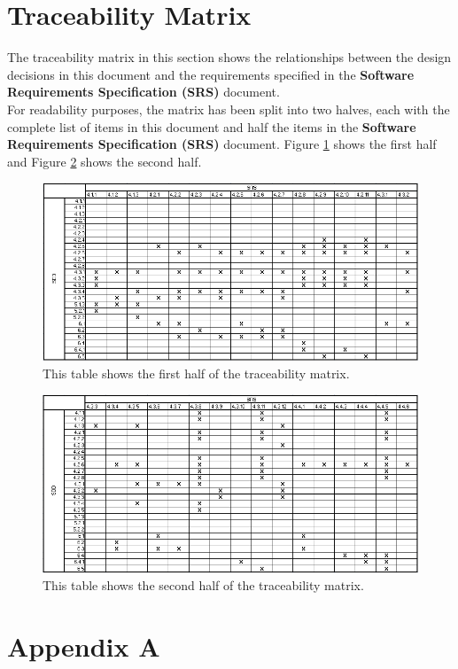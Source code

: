 \documentclass[11pt]{article}
\begin{document}
\section{Traceability Matrix}\label{section-trace-matrix}
The traceability matrix in this section shows the relationships between the design decisions in this document and the requirements specified in the \textbf{Software Requirements Specification (SRS)} document.\\
For readability purposes, the matrix has been split into two halves, each with the complete list of items in this document and half the items in the \textbf{Software Requirements Specification (SRS)} document. Figure \ref{tbl-trace-1} shows the first half and Figure \ref{tbl-trace-2} shows the second half.
\begin{figure}[H]
\centering
\includegraphics[width=5in]{./images/trace_matrix_1.png}
\caption[Traceability Matrix Part 1]{This table shows the first half of the traceability matrix.}
\label{tbl-trace-1}
\end{figure}
\begin{figure}[H]
\centering
\includegraphics[width=5in]{./images/trace_matrix_2.png}
\caption[Traceability Matrix Part 1]{This table shows the second half of the traceability matrix.}
\label{tbl-trace-2}
\end{figure}
\newpage
\section{Appendix A}
\end{document}

